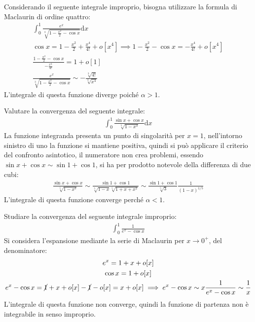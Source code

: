 \documentclass{article}
\numberwithin{equation}{subsection}
\begin{document}
Considerando il seguente integrale improprio, bisogna utilizzare la formula di Maclaurin di ordine quattro:
\begin{gather*}
    \displaystyle\int_0^1\frac{e^x}{\sqrt[3]{1-\frac{x^2}{2}-\cos x}}\mathrm{d}{x}\\
    \cos x=1-\displaystyle\frac{x^2}{2}+\frac{x^4}{4!}+o[x^4]\implies
    \displaystyle1-\frac{x^2}{2}-\cos x=-\frac{x^4}{4!}+o[x^4]\\
    \displaystyle\frac{1-\frac{x^2}{2}-\cos x}{-\frac{x^4}{4!}}=1+o[1]\\
    \displaystyle\frac{e^x}{\sqrt[3]{1-\frac{x^2}{2}-\cos x}}\sim-\frac{\sqrt[3]{4!}}{\sqrt[3]{x^4}}
\end{gather*}
L'integrale di questa funzione diverge poiché $\alpha>1$. 


Valutare la convergenza del seguente integrale:
\begin{gather*}
    \displaystyle\int_0^1\frac{\sin x+\cos x}{\sqrt[5]{1-x^3}}\mathrm{d}x
\end{gather*}
La funzione integranda presenta un punto di singolarità per $x=1$, nell'intorno sinistro di uno la funzione si mantiene positiva, quindi si può applicare il criterio del confronto asintotico, il numeratore non crea problemi, essendo $\sin x+\cos x\sim \sin1+\cos1$, si ha per prodotto notevole della differenza di due cubi:
\begin{gather*}
    \displaystyle\frac{\sin x+\cos x}{\sqrt[5]{1-x^3}}\sim\frac{\sin1+\cos1}{\sqrt[5]{1-x}\sqrt[5]{1+x+x^2}}\sim
    \frac{\sin 1+\cos 1}{\sqrt[5]{3}}\frac{1}{(1-x)^{1/5}}
\end{gather*}
L'integrale di questa funzione converge perché $\alpha<1$. 


Studiare la convergenza del seguente integrale improprio:
\begin{gather*}
    \displaystyle\int_0^1\frac{1}{e^x-\cos x}
\end{gather*}
Si considera l'espansione mediante la serie di Maclaurin per $x\to0^+$, del denominatore:
\begin{gather*}
    e^x=1+x+o[x]\\
    \cos x=1+o[x]\\
    e^x-\cos x=\cancel1+x+{o[x]}-\cancel1-{o[x]}=x+o[x]\implies e^x-\cos x\sim x
    \displaystyle\frac{1}{e^x-\cos x}\sim\frac{1}{x}
\end{gather*}
L'integrale di questa funzione non converge, quindi la funzione di partenza non è integrabile in senso improprio. 
\end{document}
